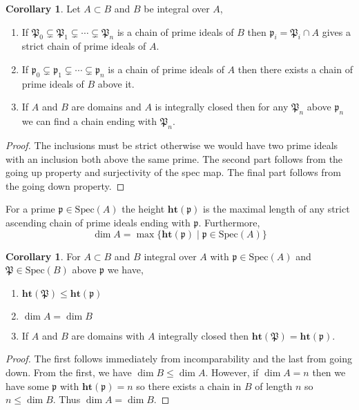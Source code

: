 \documentclass[12pt]{article}
\newcommand{\spec}[1]{\mathrm{Spec}\left( #1 \right)}
\newcommand{\p}{\mathfrak{p}}
\renewcommand{\P}{\mathfrak{P}}
\theoremstyle{remark}
\theoremstyle{definition}
\newtheorem{corollary}[theorem]{Corollary}
\newenvironment{definition}[1][Definition:]{\begin{trivlist}
\item[\hskip \labelsep {\bfseries #1}]}{\end{trivlist}}
\begin{document}
\begin{corollary}
Let $A \subset B$ and $B$ be integral over $A$,
\begin{enumerate}
\item If $\P_0 \subsetneq \P_1 \subsetneq \cdots \subsetneq \P_n$ is a chain of prime ideals of $B$ then $\p_i = \P_i \cap A$ gives a strict chain of prime ideals of $A$.
\item If $\p_0 \subsetneq \p_1 \subsetneq \cdots \subsetneq \p_n$ is a chain of prime ideals of $A$ then there exists a chain of prime ideals of $B$ above it.
\item If $A$ and $B$ are domains and $A$ is integrally closed then for any $\P_n$ above $\p_n$ we can find a chain ending with $\P_n$.   
\end{enumerate}
\end{corollary}

\begin{proof} 
The inclusions must be strict otherwise we would have two prime ideals with an inclusion both above the same prime. The second part follows from the going up property and surjectivity of the spec map. The final part follows from the going down property. 
\end{proof}

\newcommand{\height}[1]{\mathbf{ht}\left( #1 \right)}


\begin{definition}
For a prime $\p \in \spec{A}$ the height $\height{\p}$ is the maximal length of any strict ascending chain of prime ideals ending with $\p$. Furthermore,
\[ \dim{A} = \max\{ \height{\p} \mid \p \in \spec{A} \} \] 
\end{definition}

\begin{corollary}
For $A \subset B$ and $B$ integral over $A$ with $\p \in \spec{A}$ and $\P \in \spec{B}$ above $\p$ we have,
\begin{enumerate}
\item $\height{\P} \le \height{\p}$
\item $\dim{A} = \dim{B}$
\item If $A$ and $B$ are domains with $A$ integrally closed then $\height{\P} = \height{\p}$. 
\end{enumerate}
\end{corollary}

\begin{proof}
The first follows immediately from incomparability and the last from going down. From the first, we have $\dim{B} \le \dim{A}$. However, if $\dim{A} = n$ then we have some $\p$ with $\height{\p} = n$ so there exists a chain in $B$ of length $n$ so $n \le \dim{B}$. Thus $\dim{A} = \dim{B}$.
\end{proof}
\end{document}
